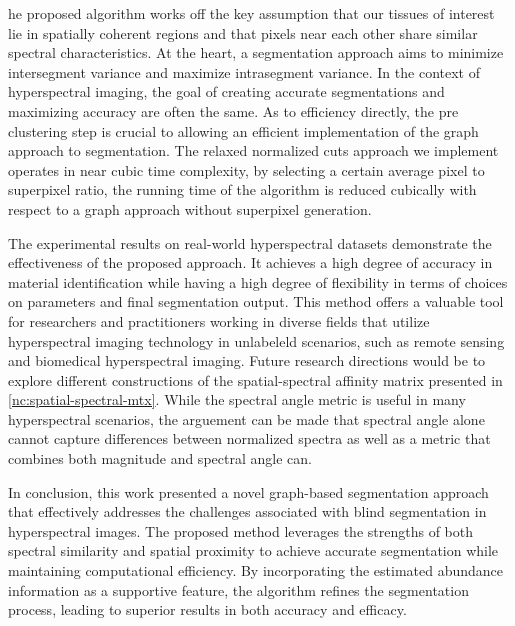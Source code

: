 he proposed algorithm works off the key assumption that our tissues of interest lie in spatially coherent regions and that pixels near each other share similar spectral characteristics. At the heart, a segmentation approach aims to minimize intersegment variance and maximize intrasegment variance. In the context of hyperspectral imaging, the goal of creating accurate segmentations and maximizing accuracy are often the same. As to efficiency directly, the pre clustering step is crucial to allowing an efficient implementation of the graph approach to segmentation. The relaxed normalized cuts approach we implement operates in near cubic time complexity, by selecting a certain average pixel to superpixel ratio, the running time of the algorithm is reduced cubically with respect to a graph approach without superpixel generation.

The experimental results on real-world hyperspectral datasets demonstrate the effectiveness of the proposed approach. It achieves a high degree of accuracy in material identification while having a high degree of flexibility in terms of choices on parameters and final segmentation output. This method offers a valuable tool for researchers and practitioners working in diverse fields that utilize hyperspectral imaging technology in unlabeleld scenarios, such as remote sensing and biomedical hyperspectral imaging. Future research directions would be to explore different constructions of the spatial-spectral affinity matrix presented in \eqref{nc:spatial-spectral-mtx}. While the spectral angle metric is useful in many hyperspectral scenarios, the arguement can be made that spectral angle alone cannot capture differences between normalized spectra as well as a metric that combines both magnitude and spectral angle can.

In conclusion, this work presented a novel graph-based segmentation approach that effectively addresses the challenges associated with blind segmentation in hyperspectral images. The proposed method leverages the strengths of both spectral similarity and spatial proximity to achieve accurate segmentation while maintaining computational efficiency. By incorporating the estimated abundance information as a supportive feature, the algorithm refines the segmentation process, leading to superior results in both accuracy and efficacy.
